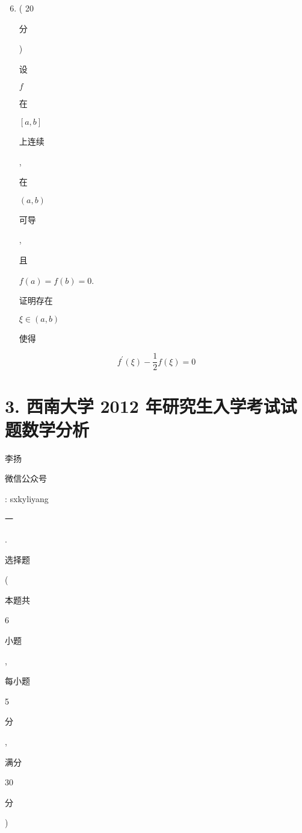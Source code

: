 \documentclass[10pt]{article}
\begin{document}
\begin{enumerate}
  \setcounter{enumi}{5}
  \item ( 20 \begin{CJK}{UTF8}{mj}分\end{CJK}) \begin{CJK}{UTF8}{mj}设\end{CJK} $f$ \begin{CJK}{UTF8}{mj}在\end{CJK} $[a, b]$ \begin{CJK}{UTF8}{mj}上连续\end{CJK}, \begin{CJK}{UTF8}{mj}在\end{CJK} $(a, b)$ \begin{CJK}{UTF8}{mj}可导\end{CJK}, \begin{CJK}{UTF8}{mj}且\end{CJK} $f(a)=f(b)=0$. \begin{CJK}{UTF8}{mj}证明存在\end{CJK} $\xi \in(a, b)$ \begin{CJK}{UTF8}{mj}使得\end{CJK}
\end{enumerate}
$$
f^{\prime}(\xi)-\frac{1}{2} f(\xi)=0
$$

\section{3. 西南大学 2012 年研究生入学考试试题数学分析}
\begin{CJK}{UTF8}{mj}李扬\end{CJK}

\begin{CJK}{UTF8}{mj}微信公众号\end{CJK}: sxkyliyang

\begin{CJK}{UTF8}{mj}一\end{CJK}. \begin{CJK}{UTF8}{mj}选择题\end{CJK} (\begin{CJK}{UTF8}{mj}本题共\end{CJK} 6 \begin{CJK}{UTF8}{mj}小题\end{CJK}, \begin{CJK}{UTF8}{mj}每小题\end{CJK} 5 \begin{CJK}{UTF8}{mj}分\end{CJK}, \begin{CJK}{UTF8}{mj}满分\end{CJK} 30 \begin{CJK}{UTF8}{mj}分\end{CJK})
\end{document}
